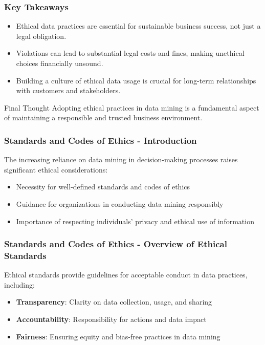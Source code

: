 \documentclass[aspectratio=169]{beamer}
\begin{document}
\begin{frame}[fragile]
    \frametitle{Key Takeaways}
    \begin{itemize}
        \item Ethical data practices are essential for sustainable business success, not just a legal obligation.
        \item Violations can lead to substantial legal costs and fines, making unethical choices financially unsound.
        \item Building a culture of ethical data usage is crucial for long-term relationships with customers and stakeholders.
    \end{itemize}
    
    \begin{block}{Final Thought}
        Adopting ethical practices in data mining is a fundamental aspect of maintaining a responsible and trusted business environment.
    \end{block}
\end{frame}

\begin{frame}[fragile]
    \frametitle{Standards and Codes of Ethics - Introduction}
    The increasing reliance on data mining in decision-making processes raises significant ethical considerations:
    \begin{itemize}
        \item Necessity for well-defined standards and codes of ethics
        \item Guidance for organizations in conducting data mining responsibly
        \item Importance of respecting individuals' privacy and ethical use of information
    \end{itemize}
\end{frame}

\begin{frame}[fragile]
    \frametitle{Standards and Codes of Ethics - Overview of Ethical Standards}
    Ethical standards provide guidelines for acceptable conduct in data practices, including:
    \begin{itemize}
        \item \textbf{Transparency}: Clarity on data collection, usage, and sharing
        \item \textbf{Accountability}: Responsibility for actions and data impact
        \item \textbf{Fairness}: Ensuring equity and bias-free practices in data mining
    \end{itemize}
\end{frame}
\end{document}

